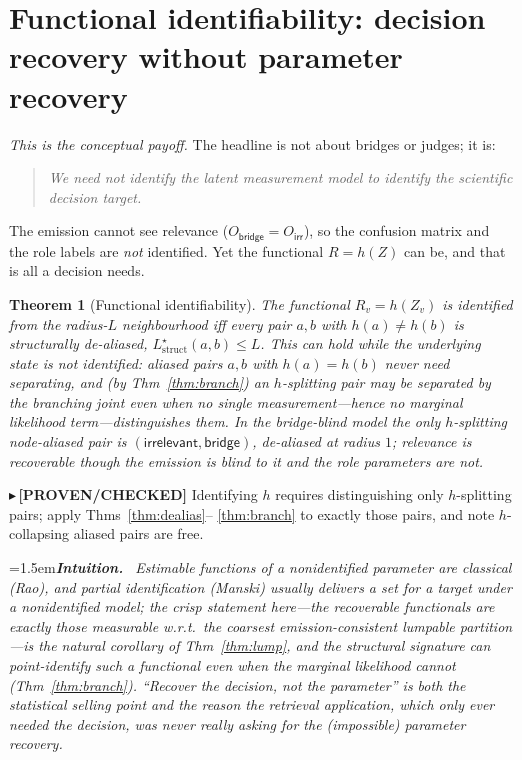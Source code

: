 \documentclass[11pt]{article}
\newtheorem{theorem}{Theorem}
\newcommand{\PROVEN}[1]{{\color{teal}\small$\blacktriangleright$\,\textbf{[PROVEN/CHECKED]} #1}}
\newenvironment{intuition}{\par\smallskip\noindent\hangindent=1.5em\textbf{\itshape Intuition.}\itshape\ \ignorespaces}{\par\smallskip}
\begin{document}
\section{Functional identifiability: decision recovery without parameter recovery}\label{sec:func}
\emph{This is the conceptual payoff.} The headline is not about bridges or judges; it is:
\begin{quote}\itshape
We need not identify the latent measurement model to identify the scientific decision target.
\end{quote}
The emission cannot see relevance ($O_{\textsf{bridge}}=O_{\textsf{irr}}$), so the confusion matrix and the role
labels are \emph{not} identified. Yet the functional $R=h(Z)$ can be, and that is all a decision needs.
\begin{theorem}[Functional identifiability]\label{cor:func}
The functional $R_v=h(Z_v)$ is identified from the radius-$L$ neighbourhood iff every pair $a,b$ with
$h(a)\neq h(b)$ is structurally de-aliased, $L^\star_{\mathrm{struct}}(a,b)\le L$. This can hold while the
underlying state is \emph{not} identified: aliased pairs $a,b$ with $h(a)=h(b)$ never need separating, and (by
Thm~\ref{thm:branch}) an $h$-splitting pair may be separated by the branching joint even when no single
measurement---hence no marginal likelihood term---distinguishes them. In the bridge-blind model the only
$h$-splitting node-aliased pair is $(\textsf{irrelevant},\textsf{bridge})$, de-aliased at radius $1$; relevance is
recoverable though the emission is blind to it and the role parameters are not.
\end{theorem}
\PROVEN{Identifying $h$ requires distinguishing only $h$-splitting pairs; apply Thms~\ref{thm:dealias}--
\ref{thm:branch} to exactly those pairs, and note $h$-collapsing aliased pairs are free.}
\begin{intuition}
Estimable functions of a nonidentified parameter are classical (Rao), and partial identification (Manski) usually
delivers a \emph{set} for a target under a nonidentified model; the crisp statement here---\emph{the recoverable
functionals are exactly those measurable w.r.t.\ the coarsest emission-consistent lumpable partition}---is the
natural corollary of Thm~\ref{thm:lump}, and the structural signature can \emph{point}-identify such a functional
even when the marginal likelihood cannot (Thm~\ref{thm:branch}). ``Recover the decision, not the parameter'' is
both the statistical selling point and the reason the retrieval application, which only ever needed the decision,
was never really asking for the (impossible) parameter recovery.
\end{intuition}
\end{document}
